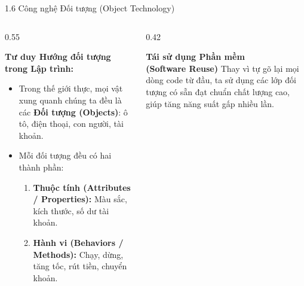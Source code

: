 \documentclass[aspectratio=169, 10pt]{beamer}
\begin{document}
\begin{frame}{1.6 Công nghệ Đối tượng (Object Technology)}
  \begin{columns}[c]
    \begin{column}{0.55\textwidth}
      \begin{block}{\textbf{Tư duy Hướng đối tượng trong Lập trình:}}
        \begin{itemize}
          \item Trong thế giới thực, mọi vật xung quanh chúng ta đều là các \textbf{Đối tượng (Objects)}: ô tô, điện thoại, con người, tài khoản.
          \item Mỗi đối tượng đều có hai thành phần:
          \begin{enumerate}
            \item \textbf{Thuộc tính (Attributes / Properties):} Màu sắc, kích thước, số dư tài khoản.
            \item \textbf{Hành vi (Behaviors / Methods):} Chạy, dừng, tăng tốc, rút tiền, chuyển khoản.
          \end{enumerate}
        \end{itemize}
      \end{block}
    \end{column}
    \begin{column}{0.42\textwidth}
      \begin{tcolorbox}[colback=CSharpPurple!10,colframe=CSharpPurple,title=\textbf{Mục tiêu Tối thượng của OOP}]
        \centering
        \textbf{\large Tái sử dụng Phần mềm\\(Software Reuse)}
        \vskip 2mm
        \scriptsize Thay vì tự gõ lại mọi dòng code từ đầu, ta sử dụng các lớp đối tượng có sẵn đạt chuẩn chất lượng cao, giúp tăng năng suất gấp nhiều lần.
      \end{tcolorbox}
    \end{column}
  \end{columns}
\end{frame}
\end{document}
